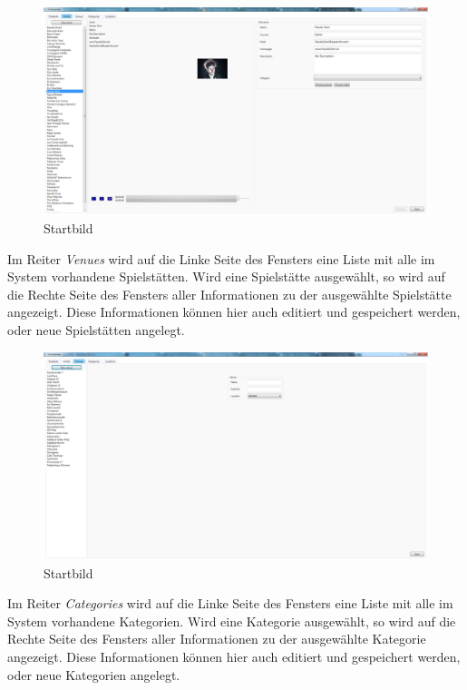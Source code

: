 \documentclass[12pt, a4paper]{article}
\begin{document}
\begin{figure}[h] 	
	\centering
		\includegraphics[width=1.0\textwidth]{ArtistWindow.png}
	\caption{Startbild}
\end{figure}
\clearpage 
Im Reiter \textit{Venues} wird auf die Linke Seite des Fensters eine Liste mit alle im System vorhandene Spielstätten. Wird eine Spielstätte ausgewählt, so wird auf die Rechte Seite des Fensters aller Informationen zu der ausgewählte Spielstätte angezeigt. Diese Informationen können hier auch editiert und gespeichert werden, oder neue Spielstätten angelegt.

\begin{figure}[h] 	
	\centering
		\includegraphics[width=1.0\textwidth]{VenueWindow.png}
	\caption{Startbild}
\end{figure}
\clearpage 
Im Reiter \textit{Categories} wird auf die Linke Seite des Fensters eine Liste mit alle im System vorhandene Kategorien. Wird eine Kategorie ausgewählt, so wird auf die Rechte Seite des Fensters aller Informationen zu der ausgewählte Kategorie angezeigt. Diese Informationen können hier auch editiert und gespeichert werden, oder neue Kategorien angelegt.
\end{document}
